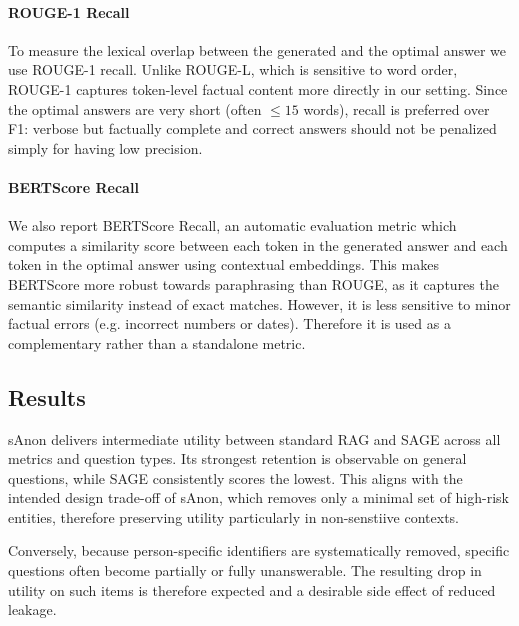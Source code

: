 \paragraph{ROUGE-1 Recall} To measure the lexical overlap between the generated and the optimal answer we use ROUGE-1 recall. Unlike ROUGE-L, which is sensitive to word order, ROUGE-1 captures token-level factual content more directly in our setting. Since the optimal answers are very short (often $\leq 15$ words), recall is preferred over F1: verbose but factually complete and correct answers should not be penalized simply for having low precision.

\paragraph{BERTScore Recall} We also report BERTScore Recall\cite{bertScore}, an automatic evaluation metric which computes a similarity score between each token in the generated answer and each token in the optimal answer using contextual embeddings. This makes BERTScore more robust towards paraphrasing than ROUGE, as it captures the semantic similarity instead of exact matches. However, it is less sensitive to minor factual errors (e.g. incorrect numbers or dates). Therefore it is used as a complementary rather than a standalone metric.


\subsection{Results}
sAnon delivers intermediate utility between standard RAG and SAGE across all metrics and question types. Its strongest retention is observable on general questions, while SAGE consistently scores the lowest. This aligns with the intended design trade-off of sAnon, which removes only a minimal set of high-risk entities, therefore preserving utility particularly in non-senstiive contexts. 

Conversely, because person-specific identifiers are systematically removed, specific questions often become partially or fully unanswerable. The resulting drop in utility on such items is therefore expected and a desirable side effect of reduced leakage.


